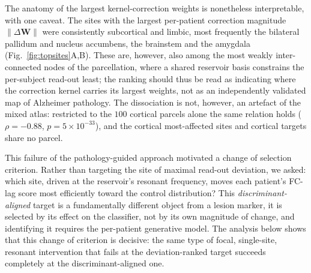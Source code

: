 \documentclass[11pt]{article}
\begin{document}
The anatomy of the largest kernel-correction weights is nonetheless interpretable,
with one caveat. The sites with the largest per-patient correction magnitude
$\lVert\Delta\mathbf{W}\rVert$ were consistently subcortical and limbic, most
frequently the bilateral pallidum and nucleus accumbens, the brainstem and the
amygdala (Fig.~\ref{fig:topsites}A,B). These are, however, also among the most
weakly inter-connected nodes of the parcellation, where a shared reservoir basis
constrains the per-subject read-out least; the ranking should thus be read as
indicating where the correction kernel carries its largest weights, not as an
independently validated map of Alzheimer pathology. The dissociation is not,
however, an artefact of the mixed atlas: restricted to the $100$ cortical parcels
alone the same relation holds ($\rho=-0.88$, $p=5\times10^{-33}$), and the
cortical most-affected sites and cortical targets share no parcel.

This failure of the pathology-guided approach motivated a change of selection
criterion. Rather than targeting the site of maximal read-out deviation, we
asked: which site, driven at the reservoir's resonant frequency, moves each
patient's FC-lag score most efficiently toward the control distribution? This
\emph{discriminant-aligned} target is a fundamentally different object from a
lesion marker, it is selected by its effect on the classifier, not by its own
magnitude of change, and identifying it requires the per-patient generative
model. The analysis below shows that this change of criterion is decisive: the
same type of focal, single-site, resonant intervention that fails at the
deviation-ranked target succeeds completely at the discriminant-aligned one.
\end{document}
